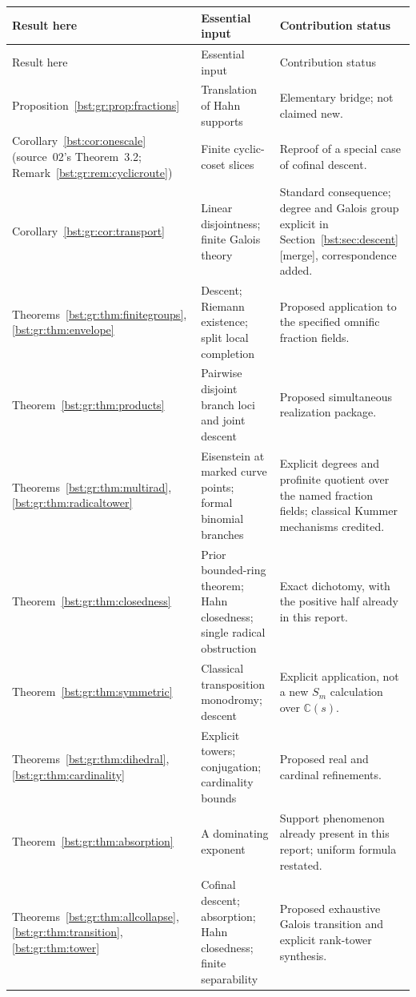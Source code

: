 \documentclass[11pt,letterpaper]{article}
\theoremstyle{definition}
\theoremstyle{remark}
\newcommand{\C}{\mathbb C}
\begin{document}
\begin{longtable}{@{}>{\raggedright\arraybackslash}p{}
>{\raggedright\arraybackslash}p{}
>{\raggedright\arraybackslash}p{}@{}}
\toprule
Result here & Essential input & Contribution status \\
\midrule
\endfirsthead
\toprule
Result here & Essential input & Contribution status \\
\midrule
\endhead
Proposition~\ref{bst:gr:prop:fractions} & Translation of Hahn supports & Elementary bridge;
not claimed new. \\
Corollary~\ref{bst:cor:onescale} (source~02's Theorem~3.2; Remark~\ref{bst:gr:rem:cyclicroute}) & Finite cyclic-coset slices & Reproof of a special
case of cofinal descent. \\
Corollary~\ref{bst:gr:cor:transport} & Linear disjointness; finite Galois theory & Standard
consequence; degree and Galois group explicit in Section~\ref{bst:sec:descent} \textup{[merge]}, correspondence added. \\
Theorems~\ref{bst:gr:thm:finitegroups}, \ref{bst:gr:thm:envelope} & Descent; Riemann existence; split
local completion & Proposed application to the specified omnific
fraction fields. \\
Theorem~\ref{bst:gr:thm:products} & Pairwise disjoint branch loci and joint descent &
Proposed simultaneous realization package. \\
Theorems~\ref{bst:gr:thm:multirad}, \ref{bst:gr:thm:radicaltower} & Eisenstein at marked curve points;
formal binomial branches & Explicit degrees and profinite quotient over
the named fraction fields; classical Kummer mechanisms credited. \\
Theorem~\ref{bst:gr:thm:closedness} & Prior bounded-ring theorem; Hahn closedness;
single radical obstruction & Exact dichotomy, with the positive half
already in this report. \\
Theorem~\ref{bst:gr:thm:symmetric} & Classical transposition monodromy; descent &
Explicit application, not a new $S_m$ calculation over $\C(s)$. \\
Theorems~\ref{bst:gr:thm:dihedral}, \ref{bst:gr:thm:cardinality} & Explicit towers; conjugation;
cardinality bounds & Proposed real and cardinal refinements. \\
Theorem~\ref{bst:gr:thm:absorption} & A dominating exponent & Support phenomenon already
present in this report; uniform formula restated. \\
Theorems~\ref{bst:gr:thm:allcollapse}, \ref{bst:gr:thm:transition}, \ref{bst:gr:thm:tower} & Cofinal descent; absorption; Hahn closedness;
finite separability & Proposed exhaustive Galois transition and explicit rank-tower synthesis. \\
\bottomrule
\end{longtable}
\end{document}
